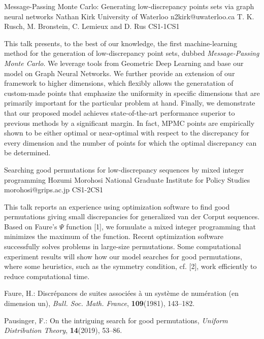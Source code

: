 \begin{talk}
  {Message-Passing Monte Carlo: Generating low-discrepancy points sets via graph neural networks}%
  {Nathan Kirk}%
  {University of Waterloo}%
  {n2kirk@uwaterloo.ca}%
  {T. K. Rusch, M. Bronstein, C. Lemieux and D. Rus}%
{}{}{CS1-1}{CS1}

			
This talk presents, to the best of our knowledge, the first machine-learning method for the generation of low-discrepancy point sets, dubbed \textit{Message-Passing Monte Carlo}. We leverage tools from Geometric Deep Learning and base our model on Graph Neural Networks. We further provide an extension of our framework to higher dimensions, which flexibly allows the generatation of custom-made points that emphasize the uniformity in specific dimensions that are primarily important for the particular problem at hand. Finally, we demonstrate that
our proposed model achieves state-of-the-art performance superior to previous methods
by a significant margin. In fact, MPMC points are empirically shown to be either optimal or
near-optimal with respect to the discrepancy for every dimension and the number of points
for which the optimal discrepancy can be determined.


\end{talk}

\begin{talk}
  {Searching good permutations for low-discrepancy sequences by mixed integer programming}%
  {Hozumi Morohosi}%
  {National Graduate Institute for Policy Studies}%
  {morohosi@grips.ac.jp}%
  {}%
{}{}{CS1-2}{CS1}

\medskip

This talk reports an experience using optimization software to find good permutations giving small discrepancies for generalized van der Corput sequences.
Based on Faure's $\Psi$ function [1], we formulate a mixed integer programming
that minimizes the maximum of the function.
Recent optimization software successfully solves problems in large-size permutations.
Some computational experiment results will show how our model searches for good permutations,
where some heuristics, such as the symmetry condition, cf. [2], work efficiently to reduce computational time.



\noindent
[1] Faure, H.: Discr\'epances de suites associ\'ees \`a un syst\`eme de num\'eration (en dimension un), {\em Bull. Soc. Math. France}, {\bf 109}(1981), 143--182.

\noindent
[2] Pausinger, F.: On the intriguing search for good permutations, {\em Uniform Distribution Theory}, {\bf 14}(2019), 53--86.
\end{talk}

